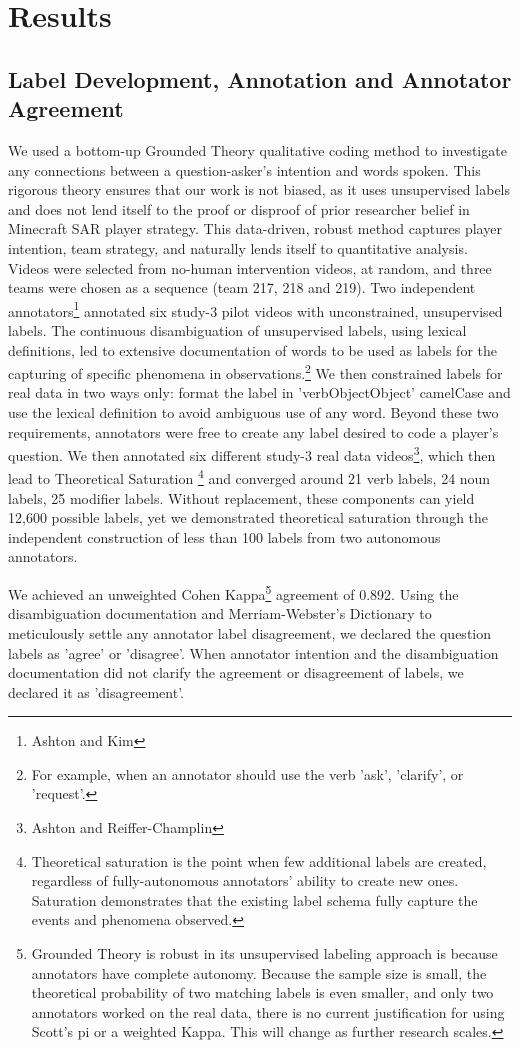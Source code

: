 \section{Results}

\subsection{Label Development, Annotation and Annotator Agreement}

We used a bottom-up Grounded Theory qualitative coding method to investigate
any connections between a question-asker's intention and words spoken. This
rigorous theory ensures that our work is not biased, as it uses unsupervised
labels and does not lend itself to the proof or disproof of prior researcher
belief in Minecraft SAR player strategy. This data-driven, robust method
captures player intention, team strategy, and naturally lends itself to
quantitative analysis. Videos were selected from no-human intervention videos,
at random, and three teams were chosen as a sequence (team 217, 218 and 219).
Two independent annotators\footnote{Ashton and Kim} annotated six study-3 pilot
videos with unconstrained, unsupervised labels. The continuous disambiguation
of unsupervised labels, using lexical definitions, led to extensive
documentation of words to be used as labels for the capturing of specific
phenomena in observations.\footnote{For example, when an annotator should use
the verb 'ask', 'clarify', or 'request'.} We then constrained labels for real
data in two ways only: format the label in 'verbObjectObject' camelCase and use
the lexical definition to avoid ambiguous use of any word. Beyond these two
requirements, annotators were free to create any label desired to code a
player's question. We then annotated six different study-3 real data
videos\footnote{Ashton and Reiffer-Champlin}, which then lead to Theoretical
Saturation \footnote{Theoretical saturation is the point when few additional
labels are created, regardless of fully-autonomous annotators' ability to
create new ones. Saturation demonstrates that the existing label schema fully
capture the events and phenomena observed.} and converged around 21 verb
labels, 24 noun labels, 25 modifier labels. Without replacement, these
components can yield 12,600 possible labels, yet we demonstrated theoretical
saturation through the independent construction of less than 100 labels from
two autonomous annotators.

We achieved an unweighted Cohen Kappa\footnote{Grounded Theory is robust in its
unsupervised labeling approach is because annotators have complete autonomy.
Because the sample size is small, the theoretical probability of two matching
labels is even smaller, and only two annotators worked on the real data, there
is no current justification for using Scott's pi or a weighted Kappa. This will
change as further research scales.} agreement of 0.892. Using the
disambiguation documentation and Merriam-Webster's Dictionary to meticulously
settle any annotator label disagreement, we declared the question labels as
'agree' or 'disagree'. When annotator intention and the disambiguation
documentation did not clarify the agreement or disagreement of labels, we
declared it as 'disagreement'. 


